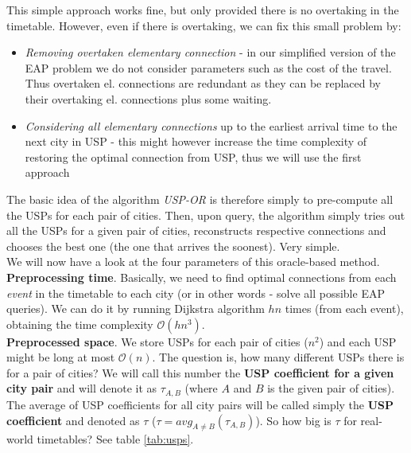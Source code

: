	This simple approach works fine, but only provided there is no overtaking in the timetable. However, even if there is overtaking, we can fix this small problem by:
	\begin{itemize}
		\item \textit{Removing overtaken elementary connection} - in our simplified version of the EAP problem we do not consider parameters such as the cost of the travel. Thus overtaken el. connections are redundant as they can be replaced by their overtaking el. connections plus some waiting.
		\item \textit{Considering all elementary connections} up to the earliest arrival time to the next city in USP - this might however increase the time complexity of restoring the optimal connection from USP, thus we will use the first approach
	\end{itemize}
	\hspace{\fill}
	
	The basic idea of the algorithm \textit{USP-OR} is therefore simply to pre-compute all the USPs for each pair of cities. Then, upon query, the algorithm simply tries out all the USPs for a given pair of cities, reconstructs respective connections and chooses the best one (the one that arrives the soonest). Very simple. \\
	
	We will now have a look at the four parameters of this oracle-based method. \\
	
	\textbf{Preprocessing time}. Basically, we need to find optimal connections from each \textit{event} in the timetable to each city (or in other words - solve all possible EAP queries). We can do it by running Dijkstra algorithm $hn$ times (from each event), obtaining the time complexity $\mathcal{O}(hn^{3})$. \\
	
	\textbf{Preprocessed space}. We store USPs for each pair of cities ($n^{2}$) and each USP might be long at most $\mathcal{O}(n)$. The question is, how many different USPs there is for a pair of cities? We will call this number the \textbf{USP coefficient for a given city pair} and will denote it as $\tau_{A, B}$ (where $A$ and $B$ is the given pair of cities). The average of USP coefficients for all city pairs will be called simply the \textbf{USP coefficient} and denoted as $\tau$ ($\tau = avg_{A \neq B} (\tau_{A, B})$). So how big is $\tau$ for real-world timetables? See table \ref{tab:usps}. \\
	
